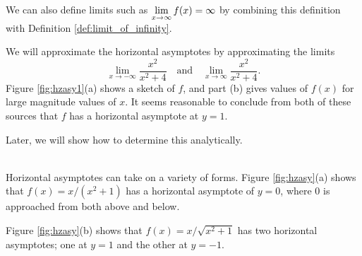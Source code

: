 We can also define limits such as $\displaystyle\lim_{x\rightarrow\infty}f(x)=\infty$ by combining this definition with Definition \ref{def:limit_of_infinity}. \\ %

\clearpage
{}
{We will approximate the horizontal asymptotes by approximating the limits $$\lim_{x\to-\infty} \frac{x^2}{x^2+4}\quad \text{and}\quad \lim_{x\to\infty} \frac{x^2}{x^2+4}.$$ Figure \ref{fig:hzasy1}(a) shows a sketch of $f$, and part (b) gives values of $f(x)$ for large magnitude values of $x$. It seems reasonable to conclude from both of these sources that $f$ has a horizontal asymptote at $y=1$.


Later, we will show how to determine this analytically.}\\

Horizontal asymptotes can take on a variety of forms. Figure \ref{fig:hzasy}(a) shows that $f(x) = x/(x^2+1)$ has a horizontal asymptote of $y=0$, where 0 is approached from both above and below.


Figure \ref{fig:hzasy}(b) shows that $f(x) =x/\sqrt{x^2+1}$ has two horizontal asymptotes; one at $y=1$ and the other at $y=-1$.


